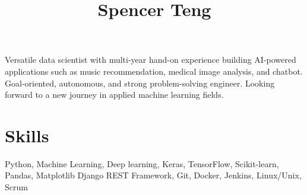 \documentclass[11pt]{article} %
\begin{document}
{\selectfont



\hspace{-1.2em}\title{ Spencer Teng } %

\noindent\begin{minipage}[t]{0.8\textwidth}
\vspace{0.5em}

Versatile data scientist with multi-year hand-on experience building AI-powered applications such
as music recommendation, medical image analysis, and chatbot. Goal-oriented, autonomous,
and strong problem-solving engineer. Looking forward to a new journey in applied machine
learning fields.


\section{Skills}
%

Python, Machine Learning, Deep learning, Keras, TensorFlow, Scikit-learn, Pandas, Matplotlib 
Django REST Framework, Git, Docker, Jenkins, Linux/Unix, Scrum


\end{minipage}}
\end{document}
